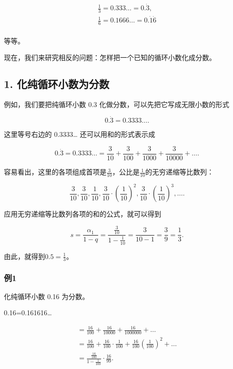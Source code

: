 \[
\begin{array}{l} \frac{1}{3} = 0.333 \dots = 0. \dot {3}, \\ \frac{1}{6} = 0.1666 \dots = 0. \dot {1} \dot {6} \\ \end{array}
\]

等等。

现在，我们来研究相反的问题：怎样把一个已知的循环小数化成分数。

\subsection{1. 化纯循环小数为分数}

例如，我们要把纯循环小数 0.3 化做分数，可以先把它写成无限小数的形式

\[
0. \dot {3} = 0.3333 \dots.
\]

这里等号右边的 0.3333\ldots{} 还可以用和的形式表示成

\[
0. \dot {3} = 0.3333 \dots = \frac{3}{10} + \frac{3}{100} + \frac{3}{1000} + \frac{3}{10000} + \dots.
\]

容易看出，这里的各项组成首项是\(\frac{3}{10}\)，公比是\(\frac{1}{10}\)的无穷递缩等比数列：

\[
\frac{3}{10}, \frac{3}{10}, \frac{1}{10}, \frac{3}{10} \cdot \left(\frac{1}{10}\right)^{2}, \frac{3}{10} \cdot \left(\frac{1}{10}\right)^{3}, \dots.
\]

应用无穷递缩等比数列各项的和的公式，就可以得到

\[
s = \frac{\alpha_{1}}{1 - q} = \frac{\frac{3}{10}}{1 - \frac{1}{10}} = \frac{3}{10 - 1} = \frac{3}{9} = \frac{1}{3}.
\]

由此，就得到\(0.5 = \frac{1}{3}\)。

\subsubsection{例1}

化纯循环小数 0.16 为分数。

 0.16=0.161616\ldots{}

\[
\begin{array}{l} = \frac{16}{100} + \frac{16}{10000} + \frac{16}{1000000} + \dots \\ = \frac{16}{100} + \frac{16}{100} \cdot \frac{1}{100} + \frac{16}{100} \left(\frac{1}{100}\right)^{2} + \dots \\ = \frac{\frac{16}{100}}{1 - \frac{1}{100}} \cdot \frac{16}{99}. \\ \end{array}
\]

